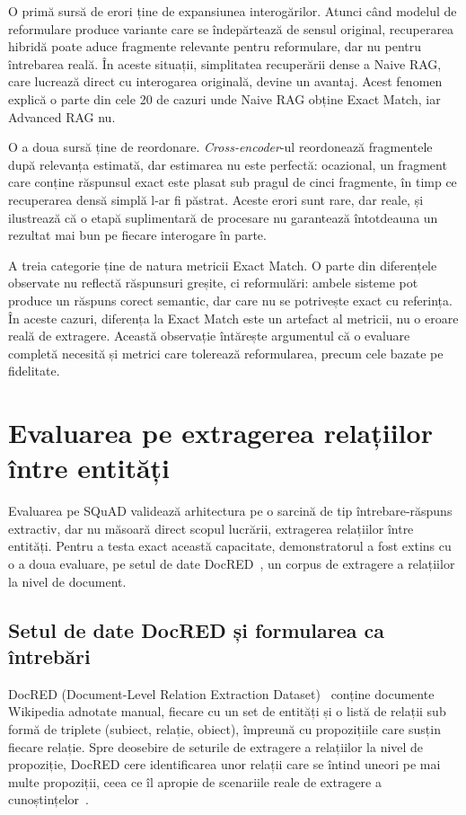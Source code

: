 O primă sursă de erori ține de expansiunea interogărilor. Atunci când modelul de reformulare produce variante care se îndepărtează de sensul original, recuperarea hibridă poate aduce fragmente relevante pentru reformulare, dar nu pentru întrebarea reală. În aceste situații, simplitatea recuperării dense a Naive RAG, care lucrează direct cu interogarea originală, devine un avantaj. Acest fenomen explică o parte din cele 20 de cazuri unde Naive RAG obține Exact Match, iar Advanced RAG nu.

O a doua sursă ține de reordonare. \textit{Cross-encoder}-ul reordonează fragmentele după relevanța estimată, dar estimarea nu este perfectă: ocazional, un fragment care conține răspunsul exact este plasat sub pragul de cinci fragmente, în timp ce recuperarea densă simplă l-ar fi păstrat. Aceste erori sunt rare, dar reale, și ilustrează că o etapă suplimentară de procesare nu garantează întotdeauna un rezultat mai bun pe fiecare interogare în parte.

A treia categorie ține de natura metricii Exact Match. O parte din diferențele observate nu reflectă răspunsuri greșite, ci reformulări: ambele sisteme pot produce un răspuns corect semantic, dar care nu se potrivește exact cu referința. În aceste cazuri, diferența la Exact Match este un artefact al metricii, nu o eroare reală de extragere. Această observație întărește argumentul că o evaluare completă necesită și metrici care tolerează reformularea, precum cele bazate pe fidelitate.

\section{Evaluarea pe extragerea relațiilor între entități}
\label{sec:docred}

Evaluarea pe SQuAD validează arhitectura pe o sarcină de tip întrebare-răspuns extractiv, dar nu măsoară direct scopul lucrării, extragerea relațiilor între entități. Pentru a testa exact această capacitate, demonstratorul a fost extins cu o a doua evaluare, pe setul de date DocRED~\cite{yao2019docred}, un corpus de extragere a relațiilor la nivel de document.

\subsection{Setul de date DocRED și formularea ca întrebări}

DocRED (Document-Level Relation Extraction Dataset)~\cite{yao2019docred} conține documente Wikipedia adnotate manual, fiecare cu un set de entități și o listă de relații sub formă de triplete (subiect, relație, obiect), împreună cu propozițiile care susțin fiecare relație. Spre deosebire de seturile de extragere a relațiilor la nivel de propoziție, DocRED cere identificarea unor relații care se întind uneori pe mai multe propoziții, ceea ce îl apropie de scenariile reale de extragere a cunoștințelor~\cite{yao2019docred}.

